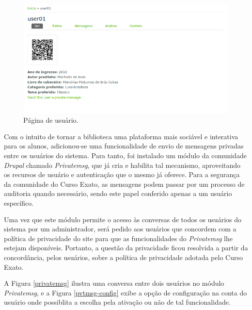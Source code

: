 \documentclass[a4paper]{article}
\begin{document}
\begin{figure}[pbth!]
\centering
\includegraphics[width=140mm]{img/userpage.png}
\caption{Página de usuário.\label{userpage}}
\end{figure}

Com o intuito de tornar a biblioteca uma plataforma mais sociável e interativa para os alunos, adicionou-se uma funcionalidade de envio de mensagens privadas entre os usuários do sistema. Para tanto, foi instalado um módulo da comunidade \textit{Drupal} chamado \textit{Privatemsg}, que já cria e habilita tal mecanismo, aproveitando os recursos de usuário e autenticação que o mesmo já oferece. Para a segurança da comunidade do Curso Exato, as mensagens podem passar por um processo de auditoria quando necessário, sendo este papel conferido apenas a um usuário específico.

Uma vez que este módulo permite o acesso às conversas de todos os usuários do sistema por um administrador, será pedido aos usuários que concordem com a política de privacidade do site para que as funcionalidades do \textit{Privatemsg} lhe estejam disponíveis. Portanto, a questão da privacidade ficou resolvida a partir da concordância, pelos usuários, sobre a política de privacidade adotada pelo Curso Exato.

A Figura \ref{privatemsg} ilustra uma conversa entre dois usuários no módulo \textit{Privatemsg}, e a Figura \ref{pvtmsg-config} exibe a opção de configuração na conta do usuário onde possiblita a escolha pela ativação ou não de tal funcionalidade.
\end{document}
